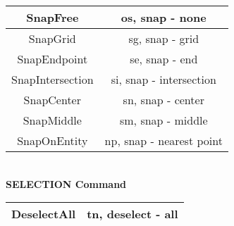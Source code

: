 \begin{table}[h!]\centering\begin{tabular}{|c|c|}
\hline SnapFree & os, snap - none\\
\hline SnapGrid & sg, snap - grid\\
\hline SnapEndpoint & se, snap - end\\
\hline SnapIntersection & si, snap - intersection\\
\hline SnapCenter & sn, snap - center\\
\hline SnapMiddle & sm, snap - middle\\
\hline SnapOnEntity & np, snap - nearest point\\
\hline \end{tabular}\end{table} \vspace{.1in}
%
\textbf{\\SELECTION Command}
\begin{table}[h!]\centering\begin{tabular}{|c|c|}
\hline DeselectAll & tn, deselect - all\\
\hline \end{tabular}\end{table}\\[-1ex]
%
